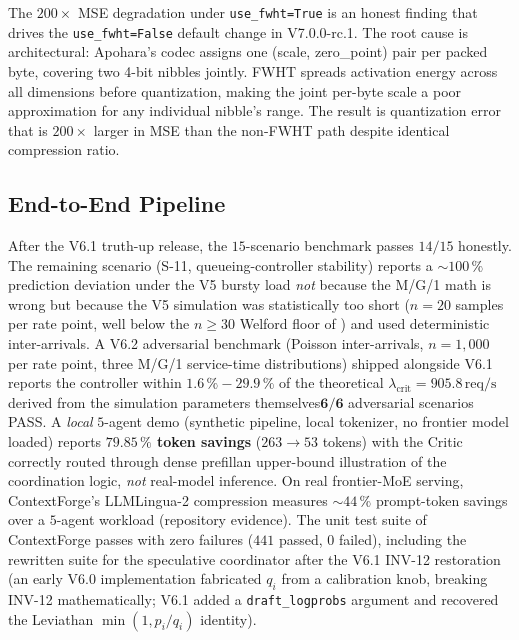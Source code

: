 \documentclass[10pt,twocolumn]{article}
\newcommand{\code}[1]{\texttt{\small #1}}
\begin{document}
The $200\times$ MSE degradation under \texttt{use\_fwht=True} is an honest
finding that drives the \texttt{use\_fwht=False} default change in
V7.0.0-rc.1. The root cause is architectural: Apohara's codec assigns one
(scale, zero\_point) pair per packed byte, covering two 4-bit nibbles
jointly. FWHT spreads activation energy across all dimensions before
quantization, making the joint per-byte scale a poor approximation for any
individual nibble's range. The result is quantization error that is
$200\times$ larger in MSE than the non-FWHT path despite identical
compression ratio.

\subsection{End-to-End Pipeline}
\label{sec:eval:e2e}

After the V6.1 truth-up release, the $15$-scenario benchmark passes
$14 / 15$ honestly. The remaining scenario (S-11, queueing-controller
stability) reports a $\sim\!100\,\%$ prediction deviation under the
V5 bursty load \emph{not} because the M/G/1 math is wrong but because
the V5 simulation was statistically too short ($n = 20$ samples per
rate point, well below the $n \geq 30$ Welford floor of \cite{queueing})
and used deterministic inter-arrivals. A V6.2 adversarial benchmark
(Poisson inter-arrivals, $n = 1{,}000$ per rate point, three M/G/1
service-time distributions) shipped alongside V6.1 reports the
controller within $1.6\,\%\!-\!29.9\,\%$ of the theoretical
$\lambda_{\text{crit}} = 905.8\,\mathrm{req/s}$ derived from the
simulation parameters themselves\textemdash $\mathbf{6/6}$ adversarial
scenarios PASS. A \emph{local} $5$-agent demo (synthetic pipeline, local tokenizer, no
frontier model loaded) reports \textbf{$79.85\,\%$ token savings}
($263 \to 53$ tokens) with the Critic correctly routed through dense
prefill\textemdash an upper-bound illustration of the coordination logic,
\emph{not} real-model inference. On real frontier-MoE serving, ContextForge's
LLMLingua-2 compression measures $\sim\!44\,\%$ prompt-token savings over a
$5$-agent workload (repository evidence). The unit test suite of ContextForge
passes with zero failures ($441$ passed, $0$ failed), including the rewritten suite
for the speculative coordinator after the V6.1 INV-12 restoration
(an early V6.0 implementation fabricated $q_i$ from a calibration
knob, breaking INV-12 mathematically; V6.1 added a
\code{draft\_logprobs} argument and recovered the Leviathan
$\min(1, p_i / q_i)$ identity).
\end{document}
